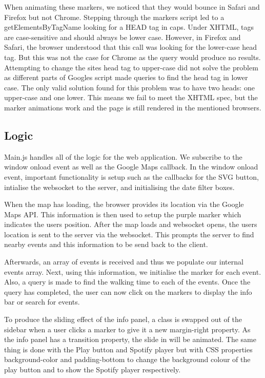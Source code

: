 \documentclass[10pt]{article}
\begin{document}
                When animating these markers, we noticed that they would bounce in Safari and Firefox but not Chrome. Stepping through the markers script led to a getElementsByTagName looking for a HEAD tag in caps. Under XHTML, tags are case-sensitive and should always be lower case. However, in Firefox and Safari, the browser understood that this call was looking for the lower-case head tag. But this was not the case for Chrome as the query would produce no results. Attempting to change the sites head tag to upper-case did not solve the problem as different parts of Google\textquotesingle s script made queries to find the head tag in lower case. The only valid solution found for this problem was to have two heads: one upper-case and one lower. This means we fail to meet the XHTML spec, but the marker animations work and the page is still rendered in the mentioned browsers. 

        \subsection{Logic}
            Main.js handles all of the logic for the web application. We subscribe to the window onload event as well as the Google Maps callback. In the window onload event, important functionality is setup such as the callbacks for the SVG button, intialise the websocket to the server, and initialising the date filter boxes.

            When the map has loading, the browser provides its location via the Google Maps API. This information is then used to setup the purple marker which indicates the user\textquotesingle s position. After the map loads and websocket opens, the user\textquotesingle s location is sent to the server via the websocket. This prompts the server to find nearby events and this information to be send back to the client.

            Afterwards, an array of events is received and thus we populate our internal events array. Next, using this information, we initialise the marker for each event. Also, a query is made to find the walking time to each of the events. Once the query has completed, the user can now click on the markers to display the info bar or search for events.

            To produce the sliding effect of the info panel, a class is swapped out of the sidebar when a user clicks a marker to give it a new margin-right property. As the info panel has a transition property, the slide in will be animated. The same thing is done with the Play button and Spotify player but with CSS properties background-color and padding-bottom to change the background colour of the play button and to show the Spotify player respectively.
\end{document}
